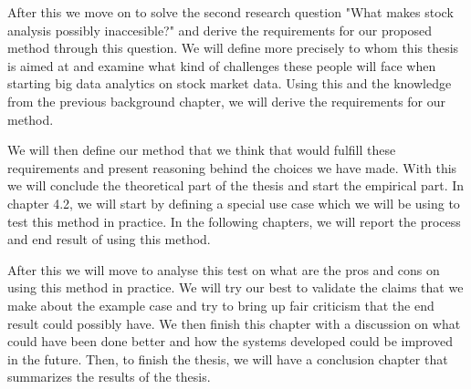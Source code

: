 After this we move on to solve the second research question "What makes stock analysis possibly inaccesible?" and derive the requirements for our proposed method through this question.
We will define more precisely to whom this thesis is aimed at and examine what kind of challenges these people will face when starting big data analytics on stock market data.
Using this and the knowledge from the previous background chapter, we will derive the requirements for our method.

We will then define our method that we think that would fulfill these requirements and present reasoning behind the choices we have made.
With this we will conclude the theoretical part of the thesis and start the empirical part.
In chapter 4.2, we will start by defining a special use case which we will be using to test this method in practice.
In the following chapters, we will report the process and end result of using this method.

After this we will move to analyse this test on what are the pros and cons on using this method in practice.
We will try our best to validate the claims that we make about the example case and try to bring up fair criticism that the end result could possibly have.
We then finish this chapter with a discussion on what could have been done better and how the systems developed could be improved in the future.
Then, to finish the thesis, we will have a conclusion chapter that summarizes the results of the thesis.




